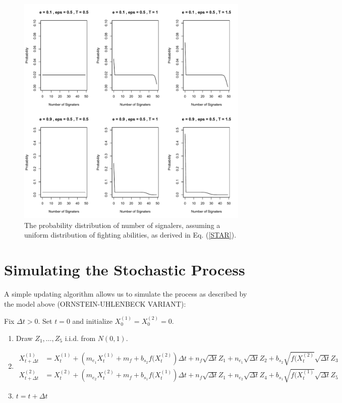\documentclass{article}
\begin{document}
\begin{figure}
\includegraphics[width=6in]{distributions_of_signals_received_uniform.pdf}
\caption{The probability distribution of number of signalers, assuming a uniform distribution of fighting abilities, as derived in Eq. (\ref{STAR}).  \label{derived_sig_probs}}
\end{figure}

\section{Simulating the Stochastic Process }
A simple updating algorithm allows us to simulate the process as described by the model above (ORNSTEIN-UHLENBECK VARIANT):

\noindent Fix $\Delta t>0$.  Set $t=0$ and initialize $X_0^{(1)}=X_0^{(2)}=0$.

\begin{enumerate}
\item Draw $Z_1,\dots,Z_5$ i.i.d. from $N(0,1)$.
\item \begin{align*}
X_{t+\Delta t}^{(1)}&=X_t^{(1)}+\left(m_{e_1}X_t^{(1)}+m_f+b_{s_2}f(X_t^{(2)}\right)\Delta t+n_f\sqrt{\Delta t}Z_1+n_{e_1}\sqrt{\Delta t}Z_2+b_{s_2}\sqrt{f(X_t^{(2)}}\sqrt{\Delta t}Z_3\\
X_{t+\Delta t}^{(2)}&=X_t^{(2)}+\left(m_{e_2}X_t^{(2)}+m_f+b_{s_1}f(X_t^{(1)}\right)\Delta t+n_f\sqrt{\Delta t}Z_1+n_{e_2}\sqrt{\Delta t}Z_4+b_{s_1}\sqrt{f(X_t^{(1)}}\sqrt{\Delta t}Z_5
\end{align*}
\item $t=t+\Delta t$


\end{enumerate}
\end{document}

